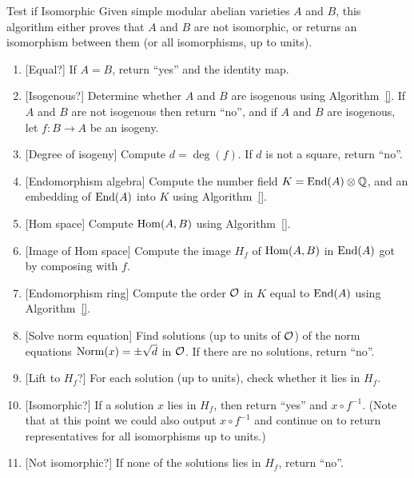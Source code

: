 \documentclass{article}
\begin{document}
\begin{algorithm}{Test if Isomorphic}\label{alg:isom}
	Given simple modular abelian varieties $A$ and $B$,
	this algorithm either proves that $A$ and $B$ are not isomorphic,
	or returns an isomorphism between them (or all isomorphisms,
	up to units).

	\begin{enumerate}
		\item{}[Equal?] If $A=B$, return ``yes'' and the identity map.
		\item{}[Isogenous?]  Determine whether $A$ and $B$ are isogenous using Algorithm~\ref{}.
		      If $A$ and $B$ are not isogenous then return ``no'', and if
		      $A$ and $B$ are isogenous, let $f: B \to A$ be an isogeny.
		\item{}[Degree of isogeny]  Compute $d = \deg(f)$. If $d$ is not a square, return ``no''.
		\item{}[Endomorphism algebra]
		      Compute the number field $K=\operatorname{End}(A)\otimes\mathbb{Q}$, and
		      an embedding of $\operatorname{End}(A)$ into $K$ using Algorithm~\ref{}.
		\item{}[Hom space] Compute $\operatorname{Hom}(A,B)$ using Algorithm~\ref{}.
		\item{}[Image of Hom space]  Compute the image $H_f$ of $\operatorname{Hom}(A,B)$ in $\operatorname{End}(A)$
		      got by composing with $f$.
		\item{}[Endomorphism ring] Compute the order $\mathcal{O}$ in $K$ equal to $\operatorname{End}(A)$
		      using Algorithm~\ref{}.
		\item{}[Solve norm equation] Find solutions (up to units of $\mathcal{O}$) of the norm equations
		      $\operatorname{Norm}(x) = \pm \sqrt{d}$ in $\mathcal{O}$. If there are no solutions, return ``no''.
		\item{}[Lift to $H_f$?]   For each solution (up to units), check whether it lies in $H_f$.
		\item{}[Isomorphic?]   If a solution $x$ lies in $H_f$, then return ``yes'' and $x\circ f^{-1}$.
		      (Note that at this point we could also output $x\circ f^{-1}$ and continue
		      on to return representatives for all isomorphisms up to units.)

		\item{}[Not isomorphic?]   If none of the solutions lies in $H_f$, return ``no''.
	\end{enumerate}
\end{algorithm}
\end{document}
